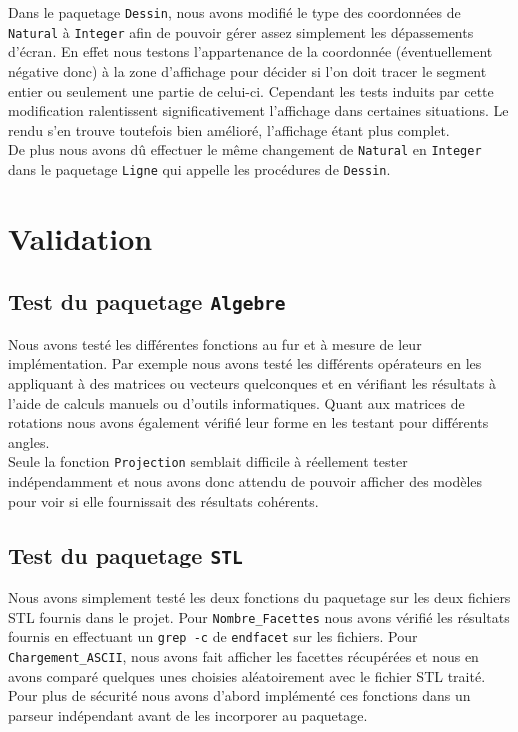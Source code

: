 \documentclass[10pt]{article}
\begin{document}
Dans le paquetage \lstinline!Dessin!, nous avons modifié le type des coordonnées de \lstinline!Natural! à \lstinline!Integer! afin de pouvoir gérer assez simplement les dépassements d'écran. En effet nous testons l'appartenance de la coordonnée (éventuellement négative donc) à la zone d'affichage pour décider si l'on doit tracer le segment entier ou seulement une partie de celui-ci. Cependant les tests induits par cette modification ralentissent significativement l'affichage dans certaines situations. Le rendu s'en trouve toutefois bien amélioré, l'affichage étant plus complet.\\
De plus nous avons dû effectuer le même changement de \lstinline!Natural! en \lstinline!Integer! dans le paquetage \lstinline!Ligne! qui appelle les procédures de \lstinline!Dessin!.

\section{Validation}

\subsection{Test du paquetage \lstinline!Algebre!}

Nous avons testé les différentes fonctions au fur et à mesure de leur implémentation. Par exemple nous avons testé les différents opérateurs en les appliquant à des matrices ou vecteurs quelconques et en vérifiant les résultats à l'aide de calculs manuels ou d'outils informatiques.
Quant aux matrices de rotations nous avons également vérifié leur forme en les testant pour différents angles.\\
Seule la fonction \lstinline!Projection! semblait difficile à réellement tester indépendamment et nous avons donc attendu de pouvoir afficher des modèles pour voir si elle fournissait des résultats cohérents.

\subsection{Test du paquetage \lstinline!STL!}

Nous avons simplement testé les deux fonctions du paquetage sur les deux fichiers STL fournis dans le projet. Pour \lstinline!Nombre_Facettes! nous avons vérifié les résultats fournis en effectuant un \lstinline!grep -c! de \lstinline!endfacet! sur les fichiers. Pour \lstinline!Chargement_ASCII!, nous avons fait afficher les facettes récupérées et nous en avons comparé quelques unes choisies aléatoirement avec le fichier STL traité.\\
Pour plus de sécurité nous avons d'abord implémenté ces fonctions dans un parseur indépendant avant de les incorporer au paquetage.
\end{document}

